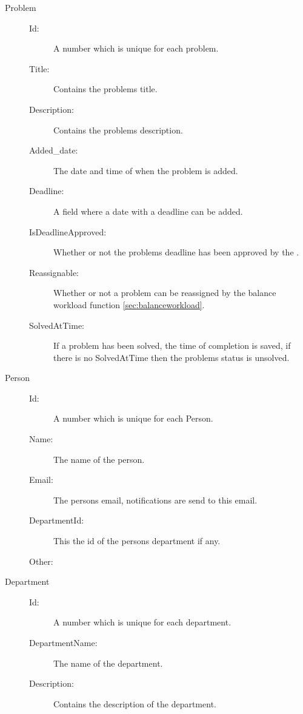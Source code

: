 \begin{description}
\item[Problem]\hfill
\begin{description}
\item[Id:] A number which is unique for each problem. 
\item[Title:] Contains the problems title.
\item[Description:] Contains the problems description.
\item[Added\_date:] The date and time of when the problem is added.
\item[Deadline:] A field where a date with a deadline can be added.
\item[IsDeadlineApproved:] Whether or not the problems deadline has been approved by the \astaff[].
\item[Reassignable:] Whether or not a problem can be reassigned by the balance workload function \ref{sec:balanceworkload}. 
\item[SolvedAtTime:] If a problem has been solved, the time of completion is saved, if there is no SolvedAtTime then the problems status is unsolved.
\end{description}
\end{description}

\begin{description}
\item[Person]\hfill
\begin{description}
\item[Id:] A number which is unique for each Person. 
\item[Name:] The name of the person.
\item[Email:] The persons email, notifications are send to this email.  
\item[DepartmentId:] This the id of the persons department if any. 
\item[Other:] 
\end{description}
\end{description}

\begin{description}
\item[Department]\hfill
\begin{description}
\item[Id:] A number which is unique for each department. 
\item[DepartmentName:] The name of the department.
\item[Description:] Contains the description of the department.
\end{description}
\end{description}


